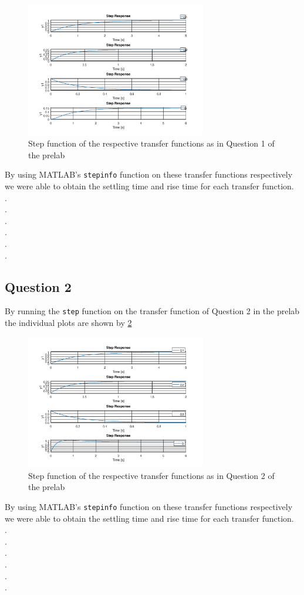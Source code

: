 \documentclass[12pt, a4paper]{article}
\begin{document}
		\begin{figure}[H]
			\centering
			\includegraphics[width=0.7\textwidth]{Images/question_1_lab.png}
			\caption{Step function of the respective transfer functions as in Question 1 of the prelab}
			\label{fig:question_1_lab} 
		\end{figure}
		
		By using MATLAB's \texttt{stepinfo} function on these transfer functions respectively we were able to obtain the  settling time and rise time for each transfer function. \\
		.\\
		.\\
		.\\
		.\\
		.\\
		.\\

		\subsection{Question 2} %
		\label{sub:question_2}
		By running the \texttt{step} function on the transfer function of Question 2 in the prelab the individual plots are shown by \ref{fig:question_2_lab}

		\begin{figure}[H]
			\centering
			\includegraphics[width=0.7\textwidth]{Images/question_2_lab.png}
			\caption{Step function of the respective transfer functions as in Question 2 of the prelab}
			\label{fig:question_2_lab} 
		\end{figure}

		By using MATLAB's \texttt{stepinfo} function on these transfer functions respectively we were able to obtain the  settling time and rise time for each transfer function. \\
		.\\
		.\\
		.\\
		.\\
		.\\
		.\\

		
		
\end{document}
